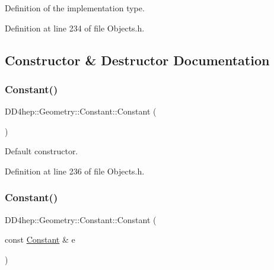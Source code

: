 Definition of the implementation type. 



Definition at line 234 of file Objects.\+h.



\subsection{Constructor \& Destructor Documentation}
\hypertarget{class_d_d4hep_1_1_geometry_1_1_constant_a4f9e9cc06e1b01401343b855a8c03b9a}{}\label{class_d_d4hep_1_1_geometry_1_1_constant_a4f9e9cc06e1b01401343b855a8c03b9a} 
\subsubsection{\texorpdfstring{Constant()}{Constant()}\hspace{0.1cm}{\footnotesize\ttfamily [1/5]}}
{\footnotesize\ttfamily D\+D4hep\+::\+Geometry\+::\+Constant\+::\+Constant (\begin{DoxyParamCaption}{ }\end{DoxyParamCaption})\hspace{0.3cm}{\ttfamily [inline]}}



Default constructor. 



Definition at line 236 of file Objects.\+h.

\hypertarget{class_d_d4hep_1_1_geometry_1_1_constant_af3b65056d896ad0554a58d9160c3d358}{}\label{class_d_d4hep_1_1_geometry_1_1_constant_af3b65056d896ad0554a58d9160c3d358} 
\subsubsection{\texorpdfstring{Constant()}{Constant()}\hspace{0.1cm}{\footnotesize\ttfamily [2/5]}}
{\footnotesize\ttfamily D\+D4hep\+::\+Geometry\+::\+Constant\+::\+Constant (\begin{DoxyParamCaption}\item[{const \hyperlink{class_d_d4hep_1_1_geometry_1_1_constant}{Constant} \&}]{e }\end{DoxyParamCaption})\hspace{0.3cm}{\ttfamily [inline]}}



